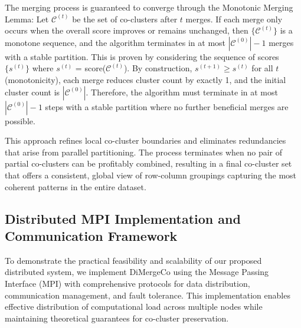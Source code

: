 \documentclass[journal]{IEEEtran}
\theoremstyle{definition}
\theoremstyle{remark} %
\begin{document}
The merging process is guaranteed to converge through the Monotonic Merging Lemma: Let $\mathcal{C}^{(t)}$ be the set of co-clusters after $t$ merges. If each merge only occurs when the overall score improves or remains unchanged, then $\{\mathcal{C}^{(t)}\}$ is a monotone sequence, and the algorithm terminates in at most $|\mathcal{C}^{(0)}|-1$ merges with a stable partition. This is proven by considering the sequence of scores $\{s^{(t)}\}$ where $s^{(t)}$ = score($\mathcal{C}^{(t)}$). By construction, $s^{(t+1)} \geq s^{(t)}$ for all $t$ (monotonicity), each merge reduces cluster count by exactly 1, and the initial cluster count is $|\mathcal{C}^{(0)}|$. Therefore, the algorithm must terminate in at most $|\mathcal{C}^{(0)}|-1$ steps with a stable partition where no further beneficial merges are possible.

This approach refines local co-cluster boundaries and eliminates redundancies that arise from parallel partitioning. The process terminates when no pair of partial co-clusters can be profitably combined, resulting in a final co-cluster set that offers a consistent, global view of row-column groupings capturing the most coherent patterns in the entire dataset.

\subsection{Distributed MPI Implementation and Communication Framework}
\label{subsec:mpi-implementation}

{\color{blue}
    To demonstrate the practical feasibility and scalability of our proposed distributed system, we implement DiMergeCo using the Message Passing Interface (MPI) with comprehensive protocols for data distribution, communication management, and fault tolerance. This implementation enables effective distribution of computational load across multiple nodes while maintaining theoretical guarantees for co-cluster preservation.
}
\end{document}
